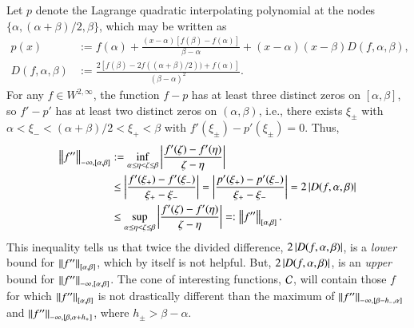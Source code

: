 \documentclass[review]{elsarticle}
\theoremstyle{definition}
\renewcommand{\cw}{W}
\begin{document}
Let $p$ denote the Lagrange quadratic interpolating polynomial at the nodes
$\{\alpha, (\alpha + \beta)/2, \beta\}$, which may be written as
\begin{align}
\nonumber
   p(x) & := f(\alpha) + \frac{(x-\alpha)[f(\beta) - f(\alpha)]}{\beta - \alpha}  +
   (x-\alpha)(x-\beta) D(f,\alpha,\beta),
\\ D(f,\alpha,\beta) &:= \frac{2[f(\beta) - 2f((\alpha + \beta)/2))
	+ f(\alpha)]}{(\beta - \alpha)^2}. \label{divdiffdef}
\end{align}
For any $f \in \cw^{2,\infty}$, the function $f - p$ has at least three distinct
zeros on $[\alpha,\beta]$, so $f' - p'$ has at least two distinct zeros on
$(\alpha,\beta)$, i.e., there exists $\xi_\pm$ with $\alpha < \xi_- < (\alpha +
\beta)/2 < \xi_+ < \beta$ with $f'(\xi_\pm) - p'(\xi_{\pm}) = 0$. Thus,
\begin{align} \label{NDDbdm}
     \norm[-\infty,{[\alpha,\beta]}]{f''}
   & := \inf_{\alpha \le \eta < \zeta \le \beta} \abs{\frac{f'(\zeta) - f'(\eta)}{\zeta - \eta}}
   \nonumber
\\ & \le \abs{\frac{f'(\xi_+) - f'(\xi_-)}{\xi_+ - \xi_-}}
   = \abs{\frac{p'(\xi_+) - p'(\xi_-)}{\xi_+ - \xi_-}} = 2 \abs{D(f,\alpha,\beta)}  \nonumber
\\ & \le \sup_{\alpha \le \eta < \zeta \le \beta} \abs{\frac{f'(\zeta) - f'(\eta)}{\zeta - \eta}}
=: \norm[{[\alpha,\beta]}]{f''}.
\end{align}
This inequality tells us that twice the divided difference,
$2\abs{D(f,\alpha,\beta)}$, is a \emph{lower} bound for
$\norm[{[\alpha,\beta]}]{f''}$, which by itself is not helpful. But,
$2\abs{D(f,\alpha,\beta)}$, is an \emph{upper} bound for
$\norm[-\infty,{[\alpha,\beta]}]{f''}$. The cone of interesting functions,
$\cc$, will contain those $f$ for which $\norm[{[\alpha,\beta]}]{f''}$ is not
drastically different than the maximum of $\norm[-\infty,{[\beta - h_-,
\alpha]}]{f''}$ and $\norm[-\infty,{[\beta, \alpha+ h_+]}]{f''}$, where $h_{\pm} > \beta -
\alpha$.
\end{document}
